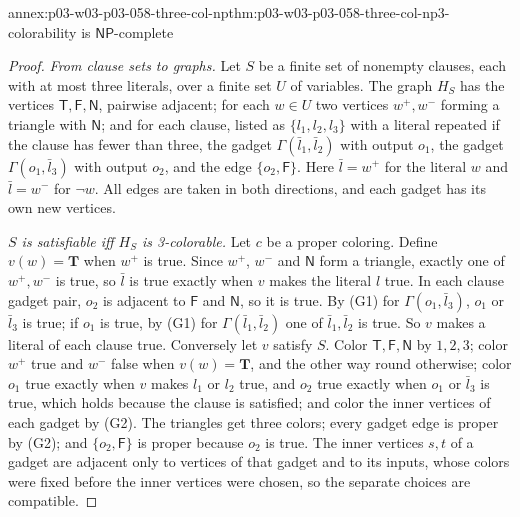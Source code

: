 \begin{annexitem}{annex:p03-w03-p03-058-three-col-np}{thm:p03-w03-p03-058-three-col-np}{3-colorability is \(\mathsf{NP}\)-complete}
\begin{proof}
\emph{From clause sets to graphs.} Let \(S\) be a finite set of nonempty
clauses, each with at most three literals, over a finite set \(U\) of
variables. The graph \(H_S\) has the vertices \(\mathsf T,\mathsf F,
\mathsf N\), pairwise adjacent; for each \(w\in U\) two vertices \(w^+,w^-\)
forming a triangle with \(\mathsf N\); and for each clause, listed as
\(\{l_1,l_2,l_3\}\) with a literal repeated if the clause has fewer than three,
the gadget \(\Gamma(\bar l_1,\bar l_2)\) with output \(o_1\), the gadget
\(\Gamma(o_1,\bar l_3)\) with output \(o_2\), and the edge
\(\{o_2,\mathsf F\}\). Here \(\bar l=w^+\) for the literal \(w\) and
\(\bar l=w^-\) for \(\neg w\). All edges are taken in both directions, and
each gadget has its own new vertices.

\emph{\(S\) is satisfiable iff \(H_S\) is 3-colorable.} Let \(c\) be a proper
coloring. Define \(v(w)=\mathbf T\) when \(w^+\) is true. Since \(w^+\),
\(w^-\) and \(\mathsf N\) form a triangle, exactly one of \(w^+,w^-\) is true,
so \(\bar l\) is true exactly when \(v\) makes the literal \(l\) true. In each
clause gadget pair, \(o_2\) is adjacent to \(\mathsf F\) and \(\mathsf N\),
so it is true. By (G1) for \(\Gamma(o_1,\bar l_3)\), \(o_1\) or \(\bar l_3\)
is true; if \(o_1\) is true, by (G1) for \(\Gamma(\bar l_1,\bar l_2)\) one of
\(\bar l_1,\bar l_2\) is true. So \(v\) makes a literal of each clause true.
Conversely let \(v\) satisfy \(S\). Color \(\mathsf T,\mathsf F,\mathsf N\)
by \(1,2,3\); color \(w^+\) true and \(w^-\) false when \(v(w)=\mathbf T\),
and the other way round otherwise; color \(o_1\) true exactly when \(v\) makes
\(l_1\) or \(l_2\) true, and \(o_2\) true exactly when \(o_1\) or \(\bar l_3\)
is true, which holds because the clause is satisfied; and color the inner
vertices of each gadget by (G2). The triangles get three colors; every gadget
edge is proper by (G2); and \(\{o_2,\mathsf F\}\) is proper because \(o_2\) is
true. The inner vertices \(s,t\) of a gadget are adjacent only to vertices of
that gadget and to its inputs, whose colors were fixed before the inner
vertices were chosen, so the separate choices are compatible.


\end{proof}
\end{annexitem}

